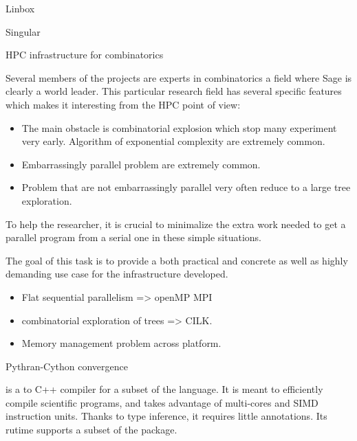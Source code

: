 \begin{Workpackage}{\thewpno}
\begin{task}{Linbox}
\end{task}

\begin{task}{Singular}
  \label{task:hpc_singular}

\end{task}


\begin{task}{HPC infrastructure for combinatorics}
  \label{task:hpc_combi}

  Several members of the projects are experts in combinatorics a field where
  Sage is clearly a world leader. This particular research field has several
  specific features which makes it interesting from the HPC point of view:
  \begin{itemize}
  \item The main obstacle is combinatorial explosion which stop many
    experiment very early. Algorithm of exponential complexity are extremely
    common.
  \item Embarrassingly parallel problem are extremely common.
  \item Problem that are not embarrassingly parallel very often reduce to a
    large tree exploration.
  \end{itemize}
  To help the researcher, it is crucial to minimalize the extra work needed to
  get a parallel program from a serial one in these simple situations.

  The goal of this task is to provide a both practical and concrete as well as
  highly demanding use case for the infrastructure developed.
  \begin{itemize}
  \item Flat sequential parallelism => openMP MPI
  \item combinatorial exploration of trees => CILK.
   \item Memory management problem across platform.
  \end{itemize}

\end{task}

\begin{task}{Pythran-Cython convergence}
  \label{task:pythran_cython}

  \Pythran is a \Python to C++ compiler for a subset of the \Python
  language. It is meant to efficiently compile scientific programs,
  and takes advantage of multi-cores and SIMD instruction units.
  Thanks to type inference, it requires little annotations. Its rutime
  supports a subset of the \Numpy package.


\end{task}
\end{Workpackage}
